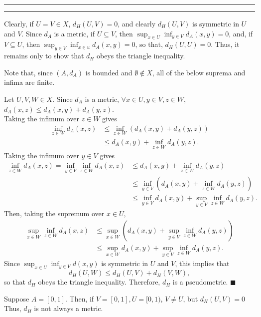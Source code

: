 \documentclass[11pt]{article}
\newcounter{questionCounter}
\newcounter{partCounter}[questionCounter]
\newenvironment{question}[2][\arabic{questionCounter}]{%
    \setcounter{partCounter}{0}%
    \vspace{.25in} \hrule \vspace{0.5em}%
        \noindent{\bf #2}%
    \vspace{0.8em} \hrule \vspace{.10in}%
    \addtocounter{questionCounter}{1}%
}{}
\renewcommand{\qed}{\quad $\blacksquare$}
\begin{document}
\begin{question}{Problem 5}
Clearly, if $U = V  \in X$, $d_H(U,V) = 0$, and clearly $d_H(U,V)$ is
symmetric in $U$ and $V$. Since $d_A$ is a metric, if $U \subseteq V$, then
$\sup_{x \in U} \inf_{y \in V} d_A(x,y) = 0$, and, if $V \subseteq U$, then
$\sup_{y \in V} \inf_{x \in u} d_A(x,y) = 0$, so that, $d_H(U,U) = 0$. Thus,
it remains only to show that $d_H$ obeys the triangle inequality.

Note that, since $(A,d_A)$ is bounded and $\emptyset \not\in X$, all of the
below suprema and infima are finite.

Let $U,V,W \in X$. Since $d_A$ is a metric,
$\forall x \in U, y \in V, z \in W$,
$d_A(x,z) \leq d_A(x,y) + d_A(y,z)$.\\
Taking the infimum over $z \in W$ gives
\begin{align*}
\inf_{z \in W} d_A(x,z)
 & \leq \inf_{z \in W} \left(d_A(x,y) + d_A(y,z)\right)                      \\
 & \leq d_A(x,y) + \inf_{z \in W} d_A(y,z).
\end{align*}
Taking the infimum over $y \in V$ gives
\begin{align*}
\inf_{z \in W} d_A(x,z)
  =    \inf_{y \in V} \inf_{z \in W} d_A(x,z)                              
 & \leq d_A(x,y) + \inf_{z \in W} d_A(y,z)                                   \\
 & \leq \inf_{y \in V} \left(d_A(x,y) + \inf_{z \in W} d_A(y,z)\right)       \\
 & \leq \inf_{y \in V} d_A(x,y) + \sup_{y \in V} \inf_{z \in W} d_A(y,z).
\end{align*}
Then, taking the supremum over $x \in U$,
\begin{align*}
\sup_{x \in W} \inf_{z \in W} d_A(x,z)
 & \leq \sup_{x \in W} \left(d_A(x,y) + \sup_{y \in V} \inf_{z \in W} d_A(y,z)\right)       \\
 & \leq \sup_{x \in W} d_A(x,y) + \sup_{y \in V} \inf_{z \in W} d_A(y,z).
\end{align*}
Since $\sup_{x \in U} \inf_{y \in V} d(x,y)$ is symmetric in $U$ and $V$, this
implies that
\[d_H(U,W) \leq d_H(U,V) + d_H(V,W),\]
so that $d_H$ obeys the triangle inequality. Therefore, $d_H$ is a
pseudometric. \qed

Suppose $A = [0,1]$. Then, if $V = [0,1],U = [0,1)$, $V \neq U$, but
$d_H(U,V) = 0$ Thus, $d_H$ is not always a metric.
\end{question}
\end{document}

